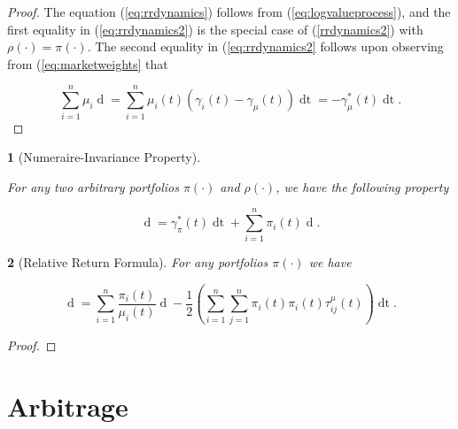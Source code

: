 \documentclass[british]{amsart}
\numberwithin{equation}{section}
\numberwithin{figure}{section}
\theoremstyle{plain}
\newtheorem{thm}{\protect\theoremname}[section]
\theoremstyle{definition}
\theoremstyle{plain}
\theoremstyle{plain}
\newtheorem{lem}[thm]{\protect\lemmaname}
\theoremstyle{plain}
\theoremstyle{remark}
\theoremstyle{plain}
\providecommand{\lemmaname}{Lemma}
\providecommand{\theoremname}{Theorem}
\renewcommand{\d}[1]{\mathop{\mathrm{d}{#1}}}
\begin{document}
\begin{proof}

	The equation (\ref{eq:rrdynamics}) follows from (\ref{eq:logvalueprocess}), and the first equality in (\ref{eq:rrdynamics2}) is the special case of (\ref{rrdynamics2}) with $\rho(\cdot) = \pi(\cdot)$. The second equality in (\ref{eq:rrdynamics2} follows upon observing from (\ref{eq:marketweights} that

	\begin{equation*}
		\sum_{i=1}^{n} \mu_{i}\d{\log{\mu_{i}(t)}} =
			\sum_{i=1}^{n} \mu_{i}(t)(\gamma_{i}(t)-\gamma_{\mu}(t))\d{t} =
			-\gamma_{\mu}^{*}(t)\d{t}.
	\end{equation*}

\end{proof}

\begin{lem} [Numeraire-Invariance Property]
	\label{lem:relativereturnoftwoportfolios}

	For any two arbitrary portfolios $\pi(\cdot)$ and $\rho(\cdot)$, we have the following property 

	\begin{equation*}
		\d{ \log{ \left( \frac{ V^{\pi}(t) }{ V^{\rho}(t) } \right) } } =
			\gamma_{\pi}^{*}(t)\d{t} + 
			\sum_{i=1}^{n} \pi_{i}(t) \d{ \log{ \left( \frac{ X_{i}(t) }{ V^{\rho}(t)} \right) }}.
	\end{equation*}

	
\end{lem}

\begin{thm} [Relative Return Formula]
	For any portfolios $\pi(\cdot)$ we have

	\begin{equation*}
			\d{ \log{ \left( \frac{ V^{\pi}(t) }{ V^{\mu}(t) } \right) } } =
				\sum_{i=1}^{n} \frac{\pi_{i}(t)}{\mu_{i}(t)} \d{\mu_{i}(t)} -
				\frac{1}{2} 
				\left( 
					\sum_{i=1}^{n} \sum_{j=1}^{n} \pi_{i}(t) \pi_{i}(t) \tau_{ij}^{\mu}(t)
				\right)
				\d{t}.
	\end{equation*}
\end{thm}

\begin{proof}
\end{proof}

\newpage

\section{Arbitrage}
\end{document}
